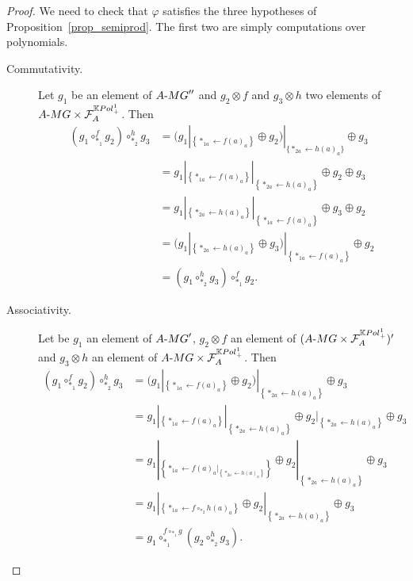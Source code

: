 \documentclass[11pt]{article}
\theoremstyle{definition}
\numberwithin{equation}{section}
\newcommand{\take}{\leftarrow}
\newcommand{\set}[1]{\left\{#1\right\}}
\newcommand{\spe}[1]{\normalfont{\textsc{#1}}}
\newcommand{\K}{\mathbb{K}}
\newcommand{\comp}[1][\ast]{\circ_{#1}}
\newcommand{\MG}{\spe{MG}}
\newcommand{\Poly}{\spe{Pol}_+}
\newcommand{\augm}[2]{#1\text{-}#2}
\newcommand{\func}[2]{\mathcal{F}_{#1}^{#2}}
\begin{document}
\begin{proof}
    We need to check that $\varphi$ satisfies the three hypotheses of Proposition~\ref{prop_semiprod}. The 
    first two are simply computations over polynomials.
    \begin{description}
        \item[Commutativity.] Let $g_1$ be an element of $\augm{A}{\MG}''$ and $g_2\otimes f$ and 
        $g_3\otimes h$ two elements of $\augm{A}{\MG}\times\func{A}{\K\Poly^1}$. Then
        \begin{equation}\begin{split}
            (g_1\comp[\ast_1]^f g_2)\comp[\ast_2]^h g_3 
            &= (g_1|_{\set{\ast_{1a}\take f(a)_a}}\oplus g_2)|_{\{\ast_{2a}\take h(a)_a\}}\oplus g_3 \\
            &= g_1|_{\set{\ast_{1a}\take f(a)_a}}|_{\set{\ast_{2a}\take h(a)_a}}\oplus g_2\oplus g_3 \\
            &= g_1|_{\set{\ast_{2a}\take h(a)_a}}|_{\set{\ast_{1a}\take f(a)_a}}\oplus g_3\oplus g_2 \\
            &= (g_1|_{\set{\ast_{2a}\take h(a)_a}}\oplus g_3)|_{\set{\ast_{1a}\take f(a)_a}}\oplus g_2 \\
            &= (g_1\comp[\ast_2]^h g_3)\comp[\ast_1]^f g_2 .
        \end{split}\end{equation}
        \item[Associativity.] Let be $g_1$ an element of $\augm{A}{\MG}'$, $g_2\otimes f$ an element of 
        $(\augm{A}{\MG}\times\func{A}{\K\Poly^1})'$ and $g_3\otimes h$ an element of 
        $\augm{A}{\MG}\times\func{A}{\K\Poly^1}$. Then
        \begin{equation}\begin{split} 
            (g_1\comp[\ast_1]^f g_2)\comp[\ast_2]^h g_3
            &= (g_1|_{\set{\ast_{1a}\take f(a)_a}}\oplus g_2)|_{\set{\ast_{2a}\take h(a)_a}}\oplus g_3 \\
            &= g_1|_{\set{\ast_{1a}\take f(a)_a}}|_{\set{\ast_{2a}\take h(a)_a}}\oplus g_2|_{\set{\ast_{2a}\take h(a)_a}}\oplus g_3 \\
            &= g_1|_{\set{\ast_{1a}\take f(a)_a|_{\set{\ast_{2a}\take h(a)_a}}}}\oplus g_2|_{\set{\ast_{2a}\take h(a)_a}}\oplus g_3 \\
            &= g_1|_{\set{\ast_{1a}\take f\comp[\ast_2] h(a)_a}}\oplus g_2|_{\set{\ast_{2a}\take h(a)_a}}\oplus g_3 \\
            &= g_1\comp[\ast_1]^{f\comp[\ast_1] g}(g_2\comp[\ast_2]^h g_3).

\end{split}
\end{equation}
\end{description}
\end{proof}
\end{document}
